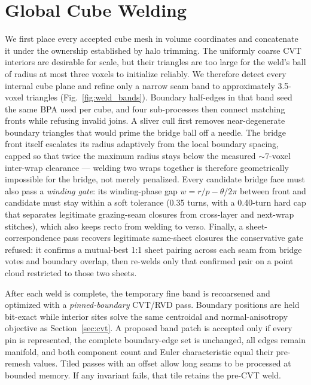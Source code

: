 \section{Global Cube Welding}
\label{sec:weld}

We first place every accepted cube mesh in volume coordinates and concatenate it under the ownership established by halo trimming. The uniformly coarse CVT interiors are desirable for scale, but their triangles are too large for the weld's ball of radius at most three voxels to initialize reliably. We therefore detect every internal cube plane and refine only a narrow seam band to approximately 3.5-voxel triangles (Fig.~\ref{fig:weld_bands}). Boundary half-edges in that band seed the same BPA used per cube, and four sub-processes then connect matching fronts while refusing invalid joins. A sliver cull first removes near-degenerate boundary triangles that would prime the bridge ball off a needle. The bridge front itself escalates its radius adaptively from the local boundary spacing, capped so that twice the maximum radius stays below the measured $\sim$7-voxel inter-wrap clearance --- welding two wraps together is therefore geometrically impossible for the bridge, not merely penalized. Every candidate bridge face must also pass a {\em winding gate}: its winding-phase gap $w = r/p - \theta/2\pi$ between front and candidate must stay within a soft tolerance (0.35 turns, with a 0.40-turn hard cap that separates legitimate grazing-seam closures from cross-layer and next-wrap stitches), which also keeps recto from welding to verso. Finally, a sheet-correspondence pass recovers legitimate same-sheet closures the conservative gate refused: it confirms a mutual-best 1:1 sheet pairing across each seam from bridge votes and boundary overlap, then re-welds only that confirmed pair on a point cloud restricted to those two sheets.

After each weld is complete, the temporary fine band is recoarsened and optimized with a {\em pinned-boundary} CVT/RVD pass. Boundary positions are held bit-exact while interior sites solve the same centroidal and normal-anisotropy objective as Section~\ref{sec:cvt}. A proposed band patch is accepted only if every pin is represented, the complete boundary-edge set is unchanged, all edges remain manifold, and both component count and Euler characteristic equal their pre-remesh values. Tiled passes with an offset allow long seams to be processed at bounded memory. If any invariant fails, that tile retains the pre-CVT weld.

